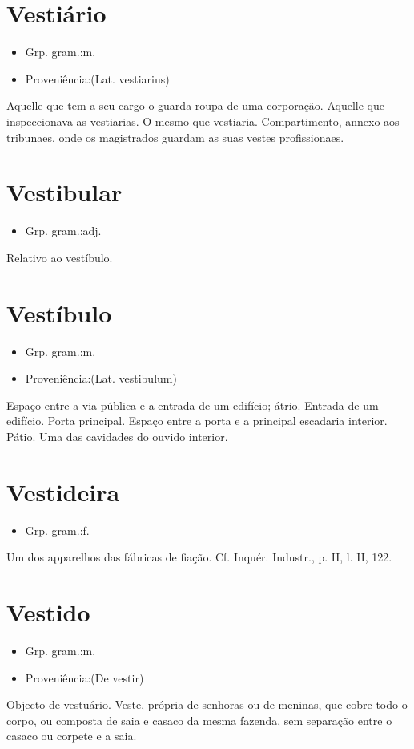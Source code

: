 \documentclass{article}
\begin{document}
\section{Vestiário}
\begin{itemize}
\item {Grp. gram.:m.}
\end{itemize}
\begin{itemize}
\item {Proveniência:(Lat. \textunderscore vestiarius\textunderscore )}
\end{itemize}
Aquelle que tem a seu cargo o guarda-roupa de uma corporação.
Aquelle que inspeccionava as vestiarias.
O mesmo que \textunderscore vestiaria\textunderscore .
Compartimento, annexo aos tribunaes, onde os magistrados guardam as suas vestes profissionaes.
\section{Vestibular}
\begin{itemize}
\item {Grp. gram.:adj.}
\end{itemize}
Relativo ao vestíbulo.
\section{Vestíbulo}
\begin{itemize}
\item {Grp. gram.:m.}
\end{itemize}
\begin{itemize}
\item {Proveniência:(Lat. \textunderscore vestibulum\textunderscore )}
\end{itemize}
Espaço entre a via pública e a entrada de um edifício; átrio.
Entrada de um edifício.
Porta principal.
Espaço entre a porta e a principal escadaria interior.
Pátio.
Uma das cavidades do ouvido interior.
\section{Vestideira}
\begin{itemize}
\item {Grp. gram.:f.}
\end{itemize}
Um dos apparelhos das fábricas de fiação. Cf. \textunderscore Inquér. Industr.\textunderscore , p. II, l. II, 122.
\section{Vestido}
\begin{itemize}
\item {Grp. gram.:m.}
\end{itemize}
\begin{itemize}
\item {Proveniência:(De \textunderscore vestir\textunderscore )}
\end{itemize}
Objecto de vestuário.
Veste, própria de senhoras ou de meninas, que cobre todo o corpo, ou composta de saia e casaco da mesma fazenda, sem separação entre o casaco ou corpete e a saia.
\end{document}
